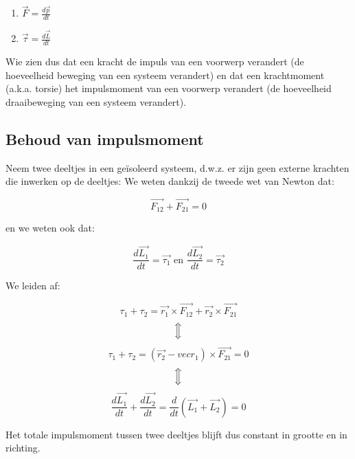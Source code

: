 \documentclass[12pt,a4paper]{article}
\newcommand{\Luda}{\Big\Updownarrow}
\begin{document}
   \begin{enumerate}
   	\item $\vec{F} = \frac{d\vec{p}}{dt}$
   	\item $\vec{\tau} = \frac{d\vec{L}}{dt}$
   \end{enumerate}

    Wie zien dus dat een kracht de impuls van een voorwerp verandert (de hoeveelheid beweging van een systeem verandert) en dat
    een krachtmoment (a.k.a. torsie) het impulsmoment van een voorwerp verandert (de hoeveelheid draaibeweging van een systeem verandert).
    
    \subsection{Behoud van impulsmoment}
    Neem twee deeltjes in een geïsoleerd systeem, d.w.z. er zijn geen externe krachten die inwerken op de deeltjes:
    We weten dankzij de tweede wet van Newton dat:
    
    $$\vec{F_{12}} + \vec{F_{21}} = 0$$
    
    en we weten ook dat:
    
    $$\frac{d\vec{L_{1}}}{dt} = \vec{\tau_{1}} \textrm{ en } \frac{d\vec{L_{2}}}{dt} = \vec{\tau_{2}}$$

    We leiden af:
    
    $$\tau_1 + \tau_2 = \vec{r_{1}} \times \vec{F_{12}} + \vec{r_{2}} \times \vec{F_{21}}$$
    $$\Luda$$
    $$\tau_1 + \tau_2 = (\vec{r_{2}} - vec{r_{1}}) \times \vec{F_{21}} = 0$$
    $$\Luda$$
    $$\frac{d\vec{L_{1}}}{dt} + \frac{d\vec{L_{2}}}{dt} = \frac{d}{dt}(\vec{L_1} + \vec{L_2}) = 0$$
    
    Het totale impulsmoment tussen twee deeltjes blijft dus constant in grootte en in richting.
    
    
\end{document}
